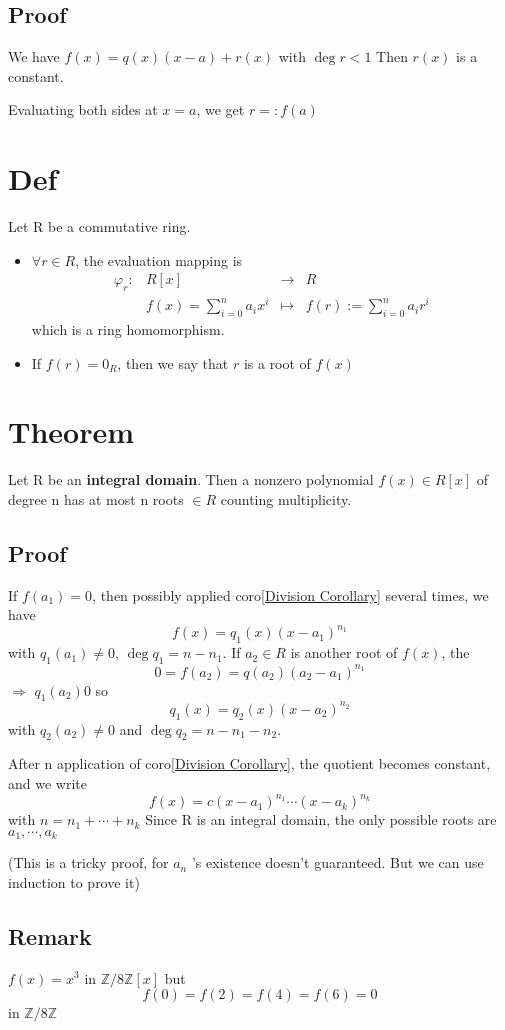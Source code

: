 \documentclass{book}
\begin{document}
\subsection*{Proof}
We have $f(x)=q(x)(x-a)+r(x)$ with $\deg r<1$ Then $r(x)$ is a constant.

Evaluating both sides at $x=a$, we get $r=:f(a)$
\section{Def}
Let R be a commutative ring. \begin{itemize}
	\item $\forall r\in R$, the evaluation mapping is $$\begin{aligned}
		\varphi_r: &R[x]&\rightarrow &R\\
		&f(x)=\sum\limits_{i=0}^na_ix^i&\mapsto&f(r):=\sum\limits_{i=0}^na_ir^i
	\end{aligned}$$which is a ring homomorphism.
	\item If $f(r)=0_R$, then we say that $r$ is a root of $f(x)$
\end{itemize}
\section{Theorem}
Let R be an \textbf{integral domain}. Then a nonzero polynomial $f(x)\in R[x]$ of degree n has at most n roots $\in R$ counting multiplicity.
\subsection*{Proof}
If $f(a_1)=0$, then possibly applied coro\ref{Division Corollary} several times, we have$$f(x)=q_1(x)(x-a_1)^{n_1}$$ with $q_1(a_1)\neq 0$, $\deg q_1=n-n_1$. If $a_2\in R$ is another root of $f(x)$, the $$0=f(a_2)=q(a_2)(a_2-a_1)^{n_1}$$
$\Rightarrow$ $q_1(a_2)0$ so $$q_1(x)=q_2(x)(x-a_2)^{n_2}$$ with $q_2(a_2)\neq 0$ and $\deg q_2=n-n_1-n_2$.

After n application of coro\ref{Division Corollary}, the quotient becomes constant, and we write $$f(x)=c(x-a_1)^{n_1}\cdots(x-a_k)^{n_k}$$with $n=n_1+\cdots+n_k$ Since R is an integral domain, the only possible roots are $a_1,\cdots,a_k$ 

(This is a tricky proof, for $a_n$ 's existence doesn't guaranteed. But we can use induction to prove it)
\subsection*{Remark}
$f(x)=x^3$ in $\mathbb Z/8\mathbb Z[x]$ but $$f(0)=f(2)=f(4)=f(6)=0$$ in $\mathbb Z/8\mathbb Z$
\end{document}
